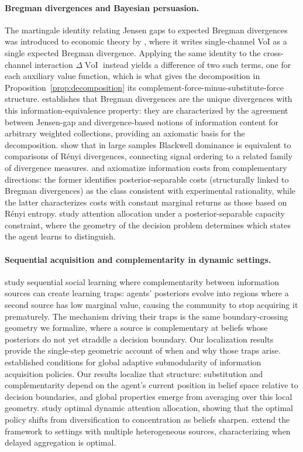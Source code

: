 \documentclass{article}
\newcommand{\VoI}{\operatorname{VoI}}
\begin{document}
\paragraph{Bregman divergences and Bayesian persuasion.}
The martingale identity relating Jensen gaps to expected Bregman divergences was introduced to economic theory by \citet{KamenicaGentzkow2011}, where it writes single-channel VoI as a single expected Bregman divergence.
Applying the same identity to the cross-channel interaction $\Delta\VoI$ instead yields a difference of two such terms, one for each auxiliary value function, which is what gives the decomposition in Proposition~\ref{prop:decomposition} its complement-force-minus-substitute-force structure.
\citet{Chodrow2025} establishes that Bregman divergences are the unique divergences with this information-equivalence property: they are characterized by the agreement between Jensen-gap and divergence-based notions of information content for arbitrary weighted collections, providing an axiomatic basis for the decomposition.
\citet{Mu2021} show that in large samples Blackwell dominance is equivalent to comparisons of R\'{e}nyi divergences, connecting signal ordering to a related family of divergence measures.
\citet{DentiMarinacciRustichini2022} and \citet{Pomatto2023} axiomatize information costs from complementary directions: the former identifies posterior-separable costs (structurally linked to Bregman divergences) as the class consistent with experimental rationality, while the latter characterizes costs with constant marginal returns as those based on R\'{e}nyi entropy.
\citet{Gossner2021} study attention allocation under a posterior-separable capacity constraint, where the geometry of the decision problem determines which states the agent learns to distinguish.

\paragraph{Sequential acquisition and complementarity in dynamic settings.}
\citet{LiangMu2020} study sequential social learning where complementarity between information sources can create learning traps: agents' posteriors evolve into regions where a second source has low marginal value, causing the community to stop acquiring it prematurely.
The mechanism driving their traps is the same boundary-crossing geometry we formalize, where a source is complementary at beliefs whose posteriors do not yet straddle a decision boundary.
Our localization results provide the single-step geometric account of when and why those traps arise.
\citet{GolovinKrause2011} established conditions for global adaptive submodularity of information acquisition policies.
Our results localize that structure: substitution and complementarity depend on the agent's current position in belief space relative to decision boundaries, and global properties emerge from averaging over this local geometry.
\citet{Che2019} study optimal dynamic attention allocation, showing that the optimal policy shifts from diversification to concentration as beliefs sharpen.
\citet{LiangMuSyrgkanis2022} extend the \citeauthor{LiangMu2020} framework to settings with multiple heterogeneous sources, characterizing when delayed aggregation is optimal.
\end{document}
